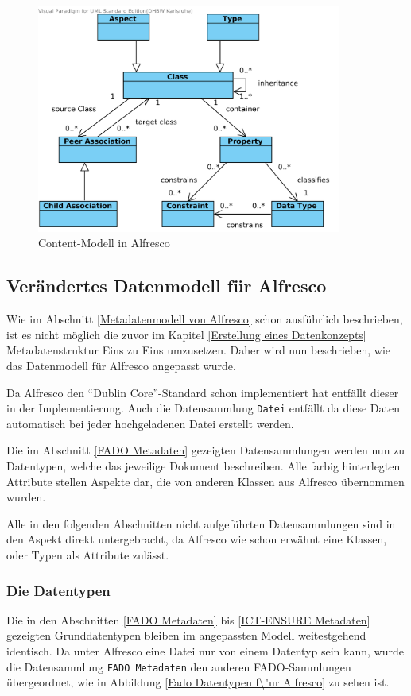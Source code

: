 \begin{figure}[!ht]
\centering
\includegraphics[width=10cm]{Bilder/Alfresco_Contentmodel.png}
\caption{Content-Modell in Alfresco}
\label{Alfresco Content-Modell}
\centering
\end{figure}

\subsection{Ver\"andertes Datenmodell f\"ur Alfresco}\label{Ver\"andertes Datenmodell f\"ur Alfresco}
Wie im Abschnitt \ref{Metadatenmodell von Alfresco} schon ausf\"uhrlich beschrieben, ist es nicht m\"oglich die zuvor im Kapitel \ref{Erstellung eines Datenkonzepts} Metadatenstruktur Eins zu Eins umzusetzen. Daher wird nun beschrieben, wie das Datenmodell f\"ur Alfresco angepasst wurde.

Da Alfresco den "`Dublin Core"'-Standard schon implementiert hat entf\"allt dieser in der Implementierung. Auch die Datensammlung \texttt{Datei} entf\"allt da diese Daten automatisch bei jeder hochgeladenen Datei erstellt werden. 

Die im Abschnitt \ref{FADO Metadaten} gezeigten Datensammlungen werden nun zu Datentypen, welche das jeweilige Dokument beschreiben. Alle farbig hinterlegten Attribute stellen Aspekte dar, die von anderen Klassen aus Alfresco \"ubernommen wurden.

Alle in den folgenden Abschnitten nicht aufgef\"uhrten Datensammlungen sind in den Aspekt direkt untergebracht, da Alfresco wie schon erw\"ahnt eine Klassen, oder Typen als Attribute zul\"asst.

\subsubsection{Die Datentypen}\label{Die Datentypen}
Die in den Abschnitten \ref{FADO Metadaten} bis \ref{ICT-ENSURE Metadaten} gezeigten Grunddatentypen bleiben im angepassten Modell weitestgehend identisch. Da unter Alfresco eine Datei nur von einem Datentyp sein kann, wurde die Datensammlung \texttt{FADO Metadaten} den anderen \ac{FADO}-Sammlungen \"ubergeordnet, wie in Abbildung \ref{Fado Datentypen f\"ur Alfresco} zu sehen ist.

